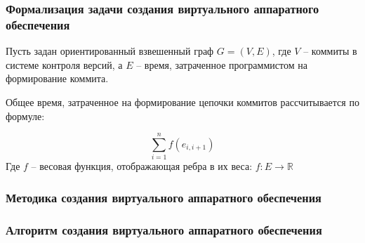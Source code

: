 \begin{frame}%
    \frametitle{Формализация задачи создания виртуального аппаратного обеспечения}
    Пусть задан ориентированный взвешенный граф $G = (V,E)$,
    где $V$ -- коммиты в системе контроля версий, а $E$ -- время,
    затраченное программистом на формирование коммита.

    Общее время, затраченное на формирование цепочки коммитов
    рассчитывается по формуле:

    \begin{equation}
        \sum_{i=1}^{n} f(e_{i,i+1})
    \end{equation}
    Где $f$ -- весовая функция, отображающая ребра в их веса: $f : E \rightarrow \mathbb{R}$
\end{frame}


\begin{frame}%
    \frametitle{Методика создания виртуального аппаратного обеспечения}
    \begin{figure}[!htbp]
        \hspace*{-5cm}
        \scalebox{0.7}{
            
        }
    \end{figure}
\end{frame}


\begin{frame}%
    \frametitle{Алгоритм создания виртуального аппаратного обеспечения}
    \begin{figure}[!htbp]
        \hspace*{-5cm}
        \scalebox{0.56}{
            
        }
    \end{figure}
\end{frame}




